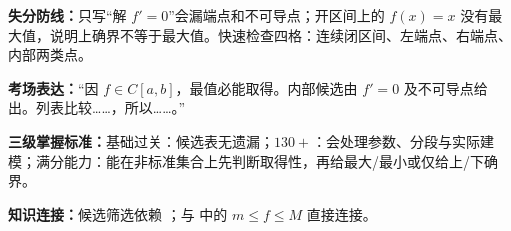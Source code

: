 \begin{knowledgeBox}
\textbf{失分防线：}只写“解 \(f'=0\)”会漏端点和不可导点；开区间上的 \(f(x)=x\) 没有最大值，说明上确界不等于最大值。快速检查四格：连续闭区间、左端点、右端点、内部两类点。

\textbf{考场表达：}“因 \(f\in C[a,b]\)，最值必能取得。内部候选由 \(f'=0\) 及不可导点给出。列表比较……，所以……。”

\textbf{三级掌握标准：}基础过关：候选表无遗漏；\(130+\)：会处理参数、分段与实际建模；满分能力：能在非标准集合上先判断取得性，再给最大/最小或仅给上/下确界。

\textbf{知识连接：}候选筛选依赖 ；与 中的 \(m\le f\le M\) 直接连接。
\end{knowledgeBox}


\par

